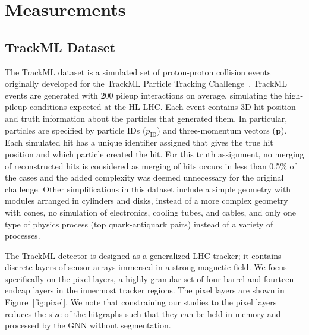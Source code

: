 \documentclass[twocolumn]{svjour3}
\begin{document}
\section{Measurements}
\label{sec:measurements}

\subsection{TrackML Dataset}
\label{sec:TrackML}
The TrackML dataset is a simulated set of proton-proton collision events originally developed for the TrackML Particle Tracking Challenge~\cite{TrackML}. 
TrackML events are generated with 200 pileup interactions on average, simulating the high-pileup conditions expected at the HL-LHC. 
Each event contains 3D hit position and truth information about the particles that generated them. 
In particular, particles are specified by particle IDs ($p_\mathrm{ID}$) and three-momentum vectors ($\mathbf{p}$).
Each simulated hit has a unique identifier assigned that gives the true hit position and which particle created the hit.
For this truth assignment, no merging of reconstructed hits is considered as merging of hits occurs in less
than 0.5\% of the cases and the added complexity was deemed unnecessary for the original challenge.
Other simplifications in this dataset include a simple geometry with modules arranged in cylinders and disks, instead of a more complex geometry with cones, no simulation of electronics, cooling tubes, and cables, and only one type of physics process (top quark-antiquark pairs) instead of a variety of processes.

The TrackML detector is designed as a generalized LHC tracker; it contains discrete layers of sensor arrays immersed in a strong magnetic field. 
We focus specifically on the pixel layers, a highly-granular set of four barrel and fourteen endcap layers in the innermost tracker regions. 
The pixel layers are shown in Figure~\ref{fig:pixel}.
We note that constraining our studies to the pixel layers reduces the size of the hitgraphs such that they can be held in memory and processed by the GNN without segmentation.
\end{document}
